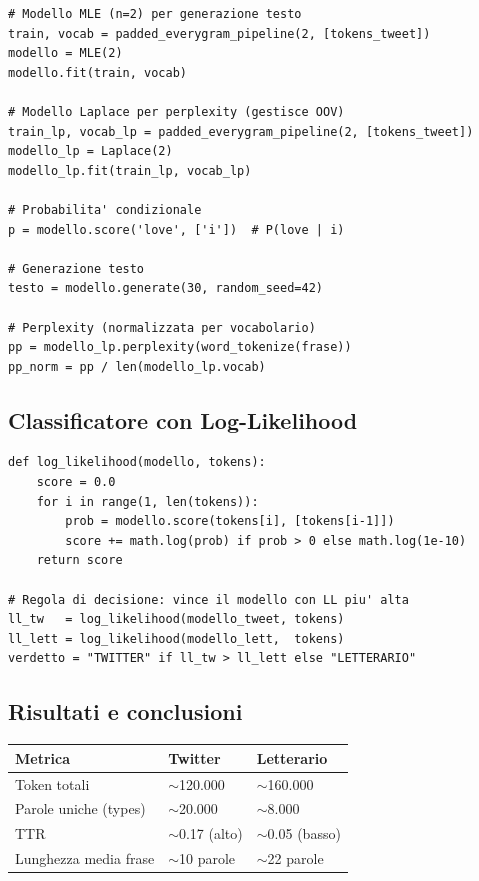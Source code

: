 \documentclass[12pt,a4paper]{article}
\begin{document}
\begin{lstlisting}
# Modello MLE (n=2) per generazione testo
train, vocab = padded_everygram_pipeline(2, [tokens_tweet])
modello = MLE(2)
modello.fit(train, vocab)

# Modello Laplace per perplexity (gestisce OOV)
train_lp, vocab_lp = padded_everygram_pipeline(2, [tokens_tweet])
modello_lp = Laplace(2)
modello_lp.fit(train_lp, vocab_lp)

# Probabilita' condizionale
p = modello.score('love', ['i'])  # P(love | i)

# Generazione testo
testo = modello.generate(30, random_seed=42)

# Perplexity (normalizzata per vocabolario)
pp = modello_lp.perplexity(word_tokenize(frase))
pp_norm = pp / len(modello_lp.vocab)
\end{lstlisting}

\subsection{Classificatore con Log-Likelihood}

\begin{lstlisting}
def log_likelihood(modello, tokens):
    score = 0.0
    for i in range(1, len(tokens)):
        prob = modello.score(tokens[i], [tokens[i-1]])
        score += math.log(prob) if prob > 0 else math.log(1e-10)
    return score

# Regola di decisione: vince il modello con LL piu' alta
ll_tw   = log_likelihood(modello_tweet, tokens)
ll_lett = log_likelihood(modello_lett,  tokens)
verdetto = "TWITTER" if ll_tw > ll_lett else "LETTERARIO"
\end{lstlisting}

\subsection{Risultati e conclusioni}

\begin{center}
\begin{tabular}{lll}
\toprule
\textbf{Metrica} & \textbf{Twitter} & \textbf{Letterario} \\
\midrule
Token totali & $\sim$120.000 & $\sim$160.000 \\
Parole uniche (types) & $\sim$20.000 & $\sim$8.000 \\
TTR & $\sim$0.17 (alto) & $\sim$0.05 (basso) \\
Lunghezza media frase & $\sim$10 parole & $\sim$22 parole \\
\bottomrule
\end{tabular}
\end{center}
\end{document}
